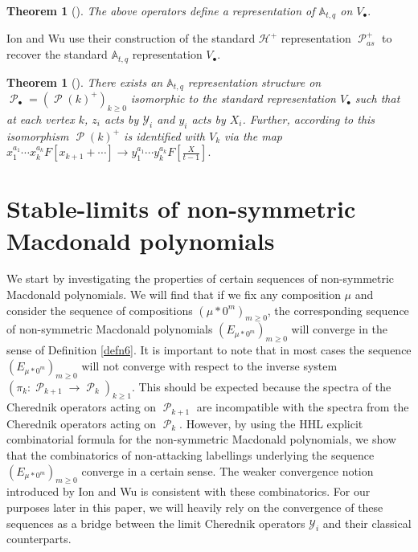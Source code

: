 \documentclass[11pt]{article}
\newtheorem{thm}[theo]{Theorem}
\theoremstyle{definition}
\numberwithin{equation}{section}
\newcommand{\y}{{ \mathscr{Y} }}
\DeclareMathOperator{\sP}{\mathscr{P} }
\begin{document}
\begin{thm}[{\cite[Thm. 7.3]{CM_2015}}]
    The above operators define a representation of $\mathbb{A}_{t,q}$ on $V_{\bullet}.$
\end{thm}


Ion and Wu use their construction of the standard $\mathscr{H}^{+}$ representation $\sP_{as}^{+}$ to recover the standard $\mathbb{A}_{t,q}$ representation $V_{\bullet}.$

\begin{thm}[{\cite[Thm. 7.14]{Ion_2022}}]
  There exists an $\mathbb{A}_{t,q}$ representation structure on $\sP_{\bullet} = (\sP(k)^{+})_{k\geq 0}$ isomorphic to the standard representation $V_{\bullet}$ such that at each vertex $k$, $z_i$ acts by $\y_i$ and $y_i$ acts by $X_i$. Further, according to this isomorphism $\sP(k)^{+}$ is identified with $V_k$ via the map $x_1^{a_1}\cdots x_k^{a_k}F[x_{k+1}+ \cdots] \rightarrow y_1^{a_1}\cdots y_k^{a_k}F[\frac{X}{t-1}].$
\end{thm} 

\section{Stable-limits of non-symmetric Macdonald polynomials}\label{stable limits of macD poly}

We start by investigating the properties of certain sequences of non-symmetric Macdonald polynomials. We will find that if we fix any composition $\mu$ and consider the sequence of compositions $(\mu*0^m)_{m\geq 0}$, the corresponding sequence of non-symmetric Macdonald polynomials $(E_{\mu*0^m})_{m\geq 0}$ will converge in the sense of Definition \ref{defn6}. It is important to note that in most cases the sequence $(E_{\mu*0^m})_{m\geq 0}$ will not converge with respect to the inverse system $(\pi_{k}: \sP_{k+1} \rightarrow \sP_{k})_{k\geq 1}$. This should be expected because the spectra of the Cherednik operators acting on $\sP_{k+1}$ are incompatible with the spectra from the Cherednik operators acting on $\sP_{k}$. However, by using the HHL explicit combinatorial formula for the non-symmetric Macdonald polynomials, we show that the combinatorics of non-attacking labellings underlying the sequence $(E_{\mu*0^m})_{m\geq 0}$ converge in a certain sense. The weaker convergence notion introduced by Ion and Wu is consistent with these combinatorics. For our purposes later in this paper, we will heavily rely on the convergence of these sequences as a bridge between the limit Cherednik operators $\y_i$ and their classical counterparts.
 
\end{document}
